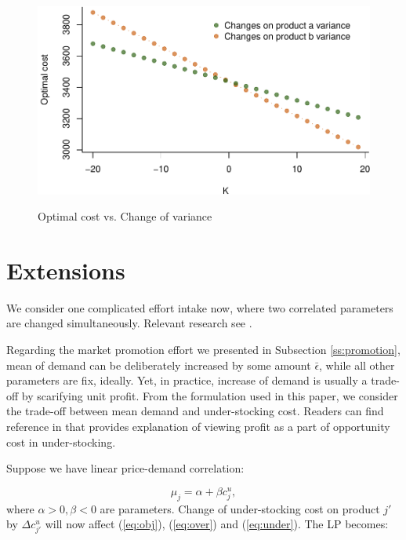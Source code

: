 \documentclass[a4paper,11pt]{article}
\begin{document}
\begin{figure}[htb]
\centering
\caption{Optimal cost vs. Change of variance}
\includegraphics{Example-figure_files/figure-latex/var-1.pdf}
\label{fig:var}
\end{figure}


\section{Extensions}
\label{se:extensions}

We consider one complicated effort intake now, where two correlated parameters are changed simultaneously. Relevant research see \cite{SHH16,XB17}.

Regarding the market promotion effort we presented in Subsection \ref{ss:promotion}, mean of demand can be deliberately increased by some amount $\bar{\epsilon}$, while all other parameters are fix, ideally. Yet, in practice, increase of demand is usually a trade-off by scarifying unit profit. From the formulation used in this paper, we consider the trade-off between mean demand and under-stocking cost. Readers can find reference in \cite{Ch12,Po02,SPP98} that provides explanation of viewing profit as a part of opportunity cost in under-stocking.

Suppose we have linear price-demand correlation:

\[
    \mu_j = \alpha + \beta c_j^u,
\]
where $\alpha > 0, \beta < 0$ are parameters. Change of under-stocking cost on product $j'$ by $\Delta c_{j'}^u$ will now affect (\ref{eq:obj}), (\ref{eq:over}) and (\ref{eq:under}). The LP becomes:
\end{document}
